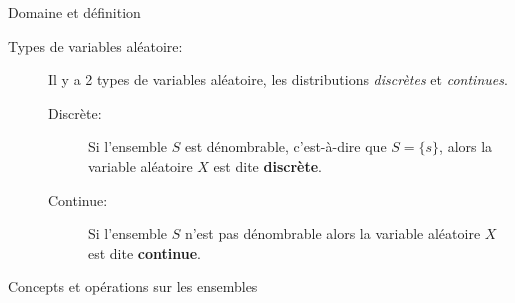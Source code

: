 \documentclass[10pt, french]{article}
\begin{document}
\begin{multicols*}{2}
\begin{rappel}{Domaine et définition}
\begin{description}
	\item[Types de variables aléatoire: ]	Il y a 2 types de variables aléatoire, les distributions \textit{discrètes} et \textit{continues}.
		\begin{description}
		\item[Discrète: ]	Si l'ensemble $S$ est dénombrable, c'est-à-dire que $S= \{s\}$, alors la variable aléatoire $X$ est dite \textbf{discrète}.
		\item[Continue: ]	Si l'ensemble $S$ n'est pas dénombrable alors la variable aléatoire $X$ est dite \textbf{continue}.
	\end{description}
\end{description}
\end{rappel}

\begin{probch2}{Concepts et opérations sur les ensembles}
\begin{description} 



\end{description}
\end{probch2}
\end{multicols*}
\end{document}
